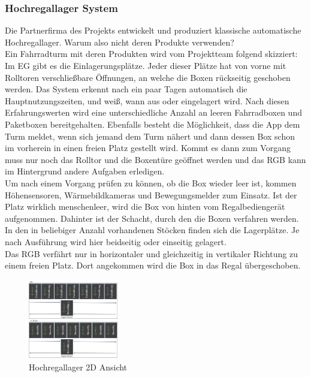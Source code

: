 \subsubsection{Hochregallager System}
Die Partnerfirma des Projekts entwickelt und produziert klassische automatische Hochregallager. Warum also nicht deren Produkte verwenden? \\
Ein Fahrradturm mit deren Produkten wird vom Projektteam folgend skizziert:\\
Im EG gibt es die Einlagerungsplätze. Jeder dieser Plätze hat von vorne mit Rolltoren verschließbare Öffnungen, an welche die Boxen rückseitig geschoben werden. Das System erkennt nach ein paar Tagen automatisch die Hauptnutzungszeiten, und weiß, wann aus oder eingelagert wird. Nach diesen Erfahrungswerten wird eine unterschiedliche Anzahl an leeren Fahrradboxen und Paketboxen bereitgehalten. Ebenfalls besteht die Möglichkeit, dass die App dem Turm meldet, wenn sich jemand dem Turm nähert und dann dessen Box schon im vorherein in einen freien Platz gestellt wird. Kommt es dann zum Vorgang muss nur noch das Rolltor und die Boxentüre geöffnet werden und das RGB kann im Hintergrund andere Aufgaben erledigen.\\
Um nach einem Vorgang prüfen zu können, ob die Box wieder leer ist, kommen Höhensensoren, Wärmebildkameras und Bewegungsmelder zum Einsatz. Ist der Platz wirklich menschenleer, wird die Box von hinten vom Regalbediengerät aufgenommen. Dahinter ist der Schacht, durch den die Boxen verfahren werden. In den in beliebiger Anzahl vorhandenen Stöcken finden sich die Lagerplätze. Je nach Ausführung wird hier beidseitig oder einseitig gelagert.\\
Das RGB verfährt nur in horizontaler und gleichzeitig in vertikaler Richtung zu einem freien Platz. Dort angekommen wird die Box in das Regal übergeschoben.\\
\begin{figure}[H]
    \centering
    \includegraphics[width=0.35\textwidth]{images/hochregallager2d.jpg}
    \caption{Hochregallager 2D Ansicht}
    \label{fig:hochregallager2d}
\end{figure}

